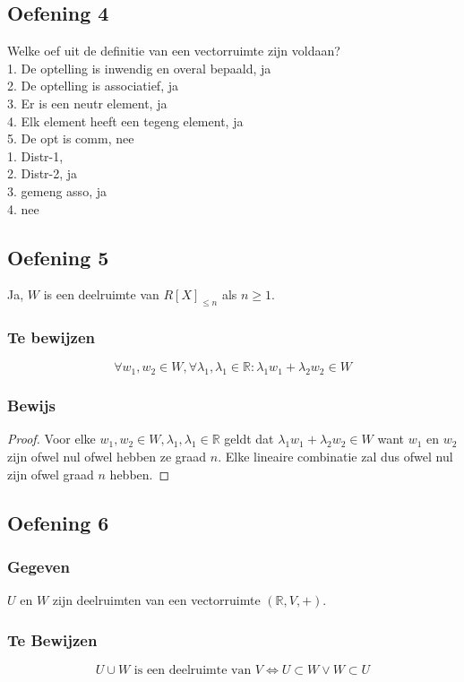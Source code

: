 \documentclass[lineaire_algebra_oplossingen.tex]{subfiles}
\begin{document}
\subsection{Oefening 4}
Welke oef uit de definitie van een vectorruimte zijn voldaan? \\
1. De optelling is inwendig en overal bepaald, ja \\
2. De optelling is associatief,	ja \\
3. Er is een neutr element, ja \\
4. Elk element heeft een tegeng element, ja \\
5. De opt is comm, nee \\

1. Distr-1, \\
2. Distr-2, ja \\
3. gemeng asso, ja\\
4. nee

\subsection{Oefening 5}
Ja, $W$ is een deelruimte van $R[X]_{\le n}$ als $n\ge 1$.
\subsubsection*{Te bewijzen}
\[
\forall w_1,w_2 \in W,\forall \lambda_1,\lambda_1 \in \mathbb{R}: \lambda_1w_1+\lambda_2w_2 \in W
\]
\subsubsection*{Bewijs}
\begin{proof}
Voor elke $w_1,w_2 \in W, \lambda_1,\lambda_1 \in \mathbb{R}$ geldt dat $ \lambda_1w_1+\lambda_2w_2 \in W$ want $w_1$ en $w_2$ zijn ofwel nul ofwel hebben ze graad $n$. Elke lineaire combinatie zal dus ofwel nul zijn ofwel graad $n$ hebben.
\end{proof}


\subsection{Oefening 6}
\subsubsection*{Gegeven}
$U$ en $W$ zijn deelruimten van een vectorruimte $(\mathbb{R},V,+)$.
\subsubsection*{Te Bewijzen}
\[
U \cup W \text{ is een deelruimte van }V \Leftrightarrow U \subset W \vee W \subset U
\]
\end{document}
